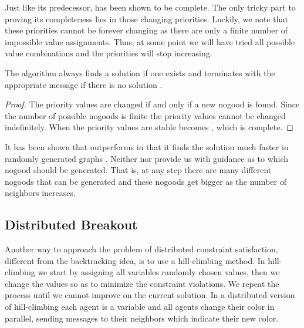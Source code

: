 Just like its predecessor,  has been shown to be complete.
The only tricky part to proving its completeness lies in those
changing priorities. Luckily, we note that these priorities cannot be
forever changing as there are only a finite number of impossible value
assignments. Thus, at some point we will have tried all possible value
combinations and the priorities will stop increasing.

\begin{theorem}
  The  algorithm always finds a solution if one exists and
  terminates with the appropriate message if there is no solution
  \cite{yokoo00a}.
\end{theorem}
\begin{proof}
  The priority values are changed if and only if a new nogood is
  found. Since the number of possible nogoods is finite the priority
  values cannot be changed indefinitely. When the priority values are
  stable  becomes , which is complete.
\end{proof}

It has been shown that  outperforms  in that it
finds the solution much faster in randomly generated graphs
\cite{yokoo00a}.  Neither  nor  provide us with
guidance as to which nogood should be generated. That is, at any step
there are many different nogoods that can be generated and these
nogoods get bigger as the number of neighbors increases.

\subsection{Distributed Breakout}
\label{sec:dbreakout}

Another way to approach the problem of distributed constraint
satisfaction, different from the backtracking idea, is to use a
hill-climbing method. In hill-climbing we start by assigning all
variables randomly chosen values, then we change the values so as to
minimize the constraint violations. We repeat the process until we
cannot improve on the current solution. In a distributed version of
hill-climbing each agent is a variable and all agents change their
color in parallel, sending messages to their neighbors which indicate
their new color.

